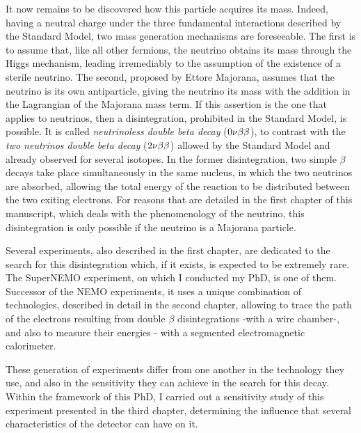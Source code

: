 It now remains to be discovered how this particle acquires its mass.
Indeed, having a neutral charge under the three fundamental interactions described by the Standard Model, two mass generation mechanisms are foreseeable.
The first is to assume that, like all other fermions, the neutrino obtains its mass through the Higgs mechanism, leading irremediably to the assumption of the existence of a sterile neutrino.
The second, proposed by Ettore Majorana, assumes that the neutrino is its own antiparticle, giving the neutrino its mass with the addition in the Lagrangian of the Majorana mass term.
If this assertion is the one that applies to neutrinos, then a disintegration, prohibited in the Standard Model, is possible.
It is called \emph{neutrinoless double beta decay} ($0\nu\beta\beta$), to contrast with the \emph{two neutrinos double beta decay} ($2\nu\beta\beta$) allowed by the Standard Model and already observed for several isotopes.
In the former disintegration, two simple $\beta$ decays take place simultaneously in the same nucleus, in which the two neutrinos are absorbed, allowing the total energy of the reaction to be distributed between the two exiting electrons.
For reasons that are detailed in the first chapter of this manuscript, which deals with the phenomenology of the neutrino, this disintegration is only possible if the neutrino is a Majorana particle.

Several experiments, also described in the first chapter, are dedicated to the search for this disintegration which, if it exists, is expected to be extremely rare.
The SuperNEMO experiment, on which I conducted my PhD, is one of them.
Successor of the NEMO experiments, it uses a unique combination of technologies, described in detail in the second chapter, allowing to trace the path of the electrons resulting from double $\beta$ disintegrations -with a wire chamber-, and also to measure their energies - with a segmented electromagnetic calorimeter.

These generation of experiments differ from one another in the technology they use, and also in the sensitivity they can achieve in the search for this decay.
Within the framework of this PhD, I carried out a sensitivity study of this experiment presented in the third chapter, determining the influence that several characteristics of the detector can have on it.

